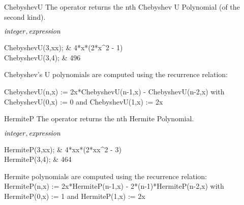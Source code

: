 \begin{Operator}{ChebyshevU}
The  operator returns the nth Chebyshev U Polynomial (of the
second kind).

\begin{Syntax}
\(\meta{integer},\meta{expression}\)
\end{Syntax}

\begin{Examples}
ChebyshevU(3,xx);                 & 4*x*(2*x^2  - 1) \\

ChebyshevU(3,4);                  &      496
\end{Examples}

\begin{Comments}
Chebyshev's U polynomials are computed using the recurrence relation:

ChebyshevU(n,x) := 2x*ChebyshevU(n-1,x) - ChebyshevU(n-2,x)  with \\
ChebyshevU(0,x) := 0 and ChebyshevU(1,x) := 2x

\end{Comments}
\end{Operator}

\begin{Operator}{HermiteP}
The  operator returns the nth Hermite Polynomial.

\begin{Syntax}
\(\meta{integer},\meta{expression}\)
\end{Syntax}

\begin{Examples}
HermiteP(3,xx);                 & 4*xx*(2*xx^2  - 3) \\
HermiteP(3,4);                  &      464
\end{Examples}

\begin{Comments}
Hermite polynomials are computed using the recurrence relation:
  \\
HermiteP(n,x) := 2x*HermiteP(n-1,x) - 2*(n-1)*HermiteP(n-2,x)  with \\
HermiteP(0,x) := 1 and HermiteP(1,x) := 2x

\end{Comments}
\end{Operator}


